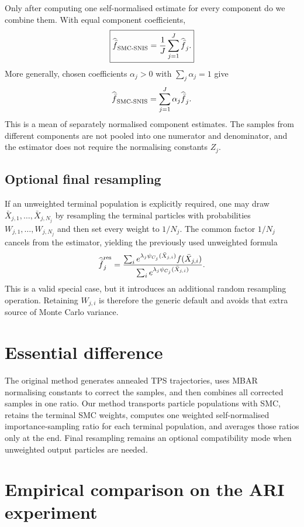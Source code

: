 \documentclass[11pt,a4paper]{article}
\newcommand{\1}{\mathbb I}
\begin{document}
Only after computing one self-normalised estimate for every component do we
combine them. With equal component coefficients,
\[
\boxed{
\widehat{\bar f}_{\rm SMC\text{-}SNIS}
=
\frac{1}{J}\sum_{j=1}^{J}\widehat{\bar f}_j.}
\]
More generally, chosen coefficients $\alpha_j>0$ with
$\sum_j\alpha_j=1$ give
\[
\widehat{\bar f}_{\rm SMC\text{-}SNIS}
=
\sum_{j=1}^{J}\alpha_j\widehat{\bar f}_j.
\]
This is a mean of separately normalised component estimates. The samples from
different components are not pooled into one numerator and denominator, and
the estimator does not require the normalising constants $Z_j$.

\subsection{Optional final resampling}

If an unweighted terminal population is explicitly required, one may draw
$\bar X_{j,1},\ldots,\bar X_{j,N_j}$ by resampling the terminal particles with
probabilities $W_{j,1},\ldots,W_{j,N_j}$ and then set every weight to $1/N_j$.
The common factor $1/N_j$ cancels from the estimator, yielding the previously
used unweighted formula
\[
\widehat{\bar f}_j^{\rm res}
=
\frac{\sum_i e^{\lambda_j\psi_{C_j}(\bar X_{j,i})}f(\bar X_{j,i})}
{\sum_i e^{\lambda_j\psi_{C_j}(\bar X_{j,i})}}.
\]
This is a valid special case, but it introduces an additional random
resampling operation. Retaining $W_{j,i}$ is therefore the generic default and
avoids that extra source of Monte Carlo variance.

\section{Essential difference}

The original method generates annealed TPS trajectories, uses MBAR
normalising constants to correct the samples, and then combines all corrected
samples in one ratio. Our method transports particle populations with SMC,
retains the terminal SMC weights, computes one weighted self-normalised
importance-sampling ratio for each terminal population, and averages those
ratios only at the end. Final resampling remains an optional compatibility
mode when unweighted output particles are needed.

\section{Empirical comparison on the ARI experiment}
\end{document}
